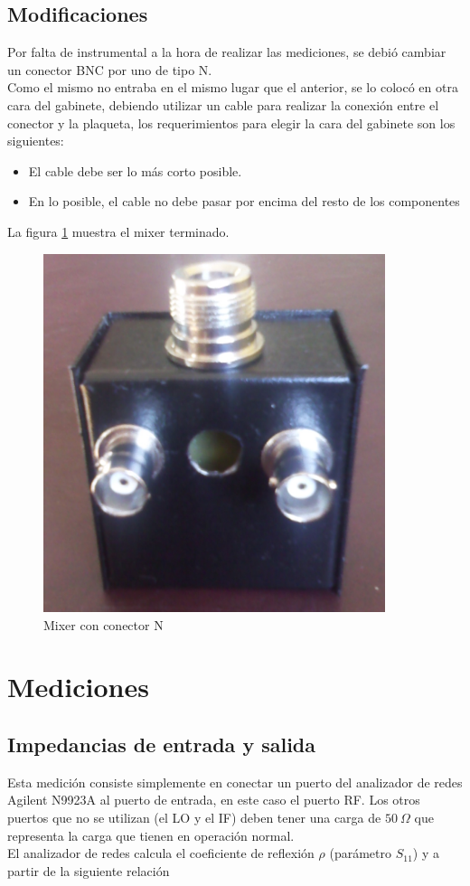 \documentclass[a4paper,10pt]{article}
\begin{document}
	\subsection{Modificaciones}
	\indent Por falta de instrumental a la hora de realizar las mediciones, se 
	debió cambiar un conector BNC por uno de tipo N. \\
	\indent Como el mismo no entraba en el mismo lugar que el anterior, se lo 
	colocó en otra cara del gabinete, debiendo utilizar un cable para realizar 
	la conexión entre el conector y la plaqueta, los requerimientos para elegir 
	la cara del gabinete son los siguientes:
	
	\begin{itemize}
		\item El cable debe ser lo más corto posible.
		\item En lo posible, el cable no debe pasar por encima del resto de los 
		componentes
	\end{itemize}

	\indent La figura \ref{mixerNuevo} muestra el mixer terminado.

	\begin{figure}[!htb]
		\centering
		\includegraphics[width=10cm]{Images/modifiedMixer.png}
		\caption{Mixer con conector N}
		\label{mixerNuevo}
	\end{figure}

	\section{Mediciones}
	\subsection{Impedancias de entrada y salida}
	\indent Esta medici\'on consiste simplemente en conectar un puerto del 
	analizador de redes Agilent N9923A al puerto de entrada, en este caso el 
	puerto RF. Los otros puertos que no se utilizan (el LO y el IF) deben tener 
	una carga de $50~\Omega$ que representa la carga que tienen en operaci\'on 
	normal. \\
	\indent El analizador de redes calcula el coeficiente de reflexi\'on $\rho$ 
	(par\'ametro $S_{11}$) y a partir de la siguiente relaci\'on
	
\end{document}
